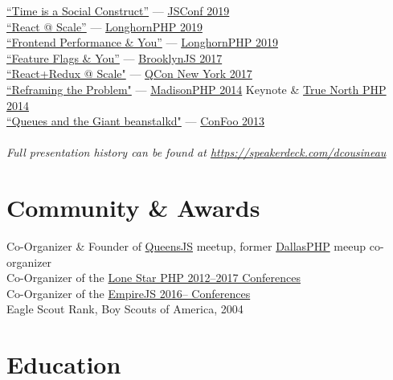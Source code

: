 \documentclass{resume}
\begin{document}
\begin{spacing}{1.25}
\href{https://speakerdeck.com/dcousineau/time-is-a-social-construct}{``Time is a Social Construct''} --- \href{https://2019.jsconf.us/speakers/daniel-cousineau}{JSConf 2019}\\
\href{https://speakerdeck.com/dcousineau/react-at-scale}{``React @ Scale''} --- \href{https://www.longhornphp.com}{LonghornPHP 2019}\\
\href{https://speakerdeck.com/dcousineau/frontend-performance-and-you}{``Frontend Performance \& You''} --- \href{https://www.longhornphp.com}{LonghornPHP 2019}\\
\href{https://speakerdeck.com/dcousineau/feature-flags-and-you}{``Feature Flags \& You''} --- \href{http://brooklynjs.com}{BrooklynJS 2017}\\
\href{https://speakerdeck.com/dcousineau/react-plus-redux-at-scale}{``React+Redux @ Scale"} --- \href{https://qconnewyork.com/ny2017/presentation/reactredux-scale-talk}{QCon New York 2017}\\
\href{https://speakerdeck.com/dcousineau/reframing-the-problem-dcjs-july-2016}{``Reframing the Problem"} --- \href{http://2014.madisonphpconference.com/schedule/view/19/reframing-the-problem-daniel-cousineau}{MadisonPHP 2014} Keynote \& \href{http://truenorthphp.ca/}{True North PHP 2014}\\
\href{https://speakerdeck.com/dcousineau/queues-and-the-giant-beanstalkd}{``Queues and the Giant beanstalkd"} --- \href{http://confoo.ca/}{ConFoo 2013}\\
\\
\emph{Full presentation history can be found at \href{https://speakerdeck.com/dcousineau}{https://speakerdeck.com/dcousineau}}
\end{spacing}

\section{Community \& Awards}

Co-Organizer \& Founder of \href{http://queensjs.com/}{QueensJS} meetup, former \href{http://www.meetup.com/dallasphp/}{DallasPHP} meeup co-organizer
\\
Co-Organizer of the \href{http://lonestarphp.com/}{Lone Star PHP 2012--2017 Conferences}
\\
Co-Organizer of the \href{http://empirejs.org/}{EmpireJS 2016-- Conferences}
\\
Eagle Scout Rank, Boy Scouts of America, 2004

\section{Education}

\end{document}

